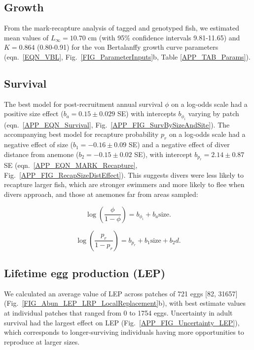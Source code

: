 \documentclass[12pt, oneside]{article}   	%
\begin{document}
\subsection{Growth}

From the mark-recapture analysis of tagged and genotyped fish, we estimated mean values of $L_\infty = 10.70$ cm (with 95\% confidence intervals 9.81-11.65) and $K = 0.864$ (0.80-0.91) for the von Bertalanffy growth curve parameters (eqn.\ \ref{EQN_VBL}, Fig.\ \ref{FIG_ParameterInputs}b, Table \ref{APP_TAB_Params}). 

\subsection{Survival}

The best model for post-recruitment annual survival $\phi$ on a log-odds scale had a positive size effect ($b_a = 0.15 \pm 0.029$ SE) with intercepts $b_{\phi_i}$ varying by patch (eqn.\ \ref{APP_EQN_Survival}, Fig.\ \ref{APP_FIG_SurvBySizeAndSite}). The accompanying best model for recapture probability $p_r$ on a log-odds scale had a negative effect of size ($b_1 = -0.16 \pm 0.09$ SE) and a negative effect of diver distance from anemone ($b_2 = -0.15 \pm 0.02$ SE), with intercept $b_{p_r} = 2.14 \pm 0.87$ SE (eqn.\ \ref{APP_EQN_MARK_Recapture}, Fig.\ \ref{APP_FIG_RecapSizeDistEffect}). This suggests divers were less likely to recapture larger fish, which are stronger swimmers and more likely to flee when divers approach, and those at anemones far from areas sampled:

\begin{equation}
\log(\frac{\phi}{1-\phi}) = b_{\phi_i} + b_a\text{size}. \label{APP_EQN_Survival}
\end{equation}

\begin{equation}
\log(\frac{p_r}{1-p_r}) = b_{p_r} + b_1\text{size} + b_2d. \label{APP_EQN_MARK_Recapture}
\end{equation}

\subsection{Lifetime egg production (LEP)} \label{APP_SEC_RESULTS_LEP}
We calculated an average value of LEP across patches of 721 eggs [82, 31657] (Fig.\ \ref{FIG_Abun_LEP_LRP_LocalReplacement}b), with best estimate values at individual patches that ranged from 0 to 1754 eggs. Uncertainty in adult survival had the largest effect on LEP (Fig.\ \ref{APP_FIG_Uncertainty_LEP}), which corresponds to longer-surviving individuals having more opportunities to reproduce at larger sizes. 
\end{document}
